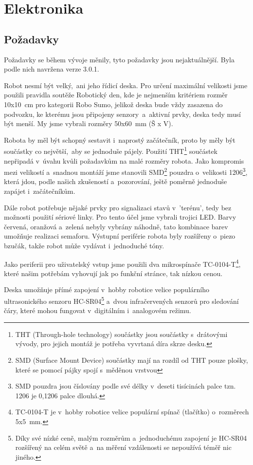 \hypertarget{Elektronika}{\chapter{Elektronika}}

\section{Požadavky}
Požadavky se během vývoje měnily, tyto požadavky jsou nejaktuálnější. Byla podle nich navržena verze 3.0.1.

Robot nesmí být velký,~ani jeho řídicí deska. Pro určení maximální velikosti jsme použili pravidla soutěže Robotický den\cite{pravidla-rd}, kde je nejmenším kritériem rozměr 10x10~cm pro kategorii Robo Sumo\cite{mini-sumo}, jelikož deska bude vždy zasazena do podvozku, ke kterému jsou připojeny senzory~a~aktivní prvky, deska tedy musí být menší. My jsme vybrali rozměry 50x60~mm (Š x V).

Robota by měl být schopný sestavit i~naprostý začátečník, proto by měly být součástky co největší,~aby se jednoduše pájely. Použití THT\footnote{THT (Through-hole technology) součástky jsou součástky s~drátovými vývody, pro jejich montáž je potřeba vyvrtaná díra skrze desku.} součástek nepřipadá v~úvahu kvůli požadavkům na malé rozměry robota. Jako kompromis mezi velikostí a~snadnou montáží jsme stanovili SMD\footnote{SMD (Surface Mount Device) součástky mají na rozdíl od THT pouze plošky, které se pomocí pájky spojí s~měděnou vrstvou} pouzdra o~velikosti 1206\footnote{SMD pouzdra jsou číslovány podle své délky v~deseti tisícinách palce tzn. 1206 je 0,1206 palce dlouhá.}, která jdou, podle našich zkušeností a~pozorování, ještě poměrně jednoduše zapájet i~začátečníkům.

Dále robot potřebuje nějaké prvky pro signalizaci stavů v~'terénu', tedy bez možnosti použití sériové linky. Pro tento účel jsme vybrali trojici LED. Barvy červená, oranžová a~zelená nebyly vybrány náhodně, tato kombinace barev umožňuje realizaci semaforu. Výstupní periférie robota byly rozšířeny o~piezo bzučák, takže robot může vydávat i~jednoduché tóny.

Jako periferii pro uživatelský vstup jsme použili dva mikrospínače TC-0104-T\footnote{TC-0104-T je v~hobby robotice velice populární spínač (tlačítko) o~rozměrech 5x5~mm.}, které našim potřebám vyhovují jak po funkční stránce, tak nízkou cenou.

Deska umožňuje přímé zapojení v~hobby robotice velice populárního ultrasonického senzoru HC-SR04\footnote{Díky své nízké ceně, malým rozměrům a~jednoduchému zapojení je HC-SR04 rozšířený na celém světě a~na měření vzdálenosti se nepoužívá téměř nic jiného.} a~dvou infračervených senzorů pro sledování čáry, které mohou fungovat v~digitálním i~analogovém režimu.


